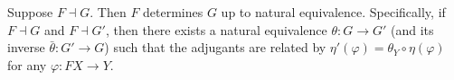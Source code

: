 Suppose $F \dashv G$. Then $F$ determines $G$ up to natural equivalence. Specifically, if $F \dashv G$ and $F \dashv G'$, then there exists a natural equivalence $\theta: G \to G'$ (and its inverse $\bar{\theta}: G' \to G$) such that the adjugants are related by $\eta'(\varphi) = \theta_Y \circ \eta(\varphi)$ for any $\varphi: FX \to Y$.
